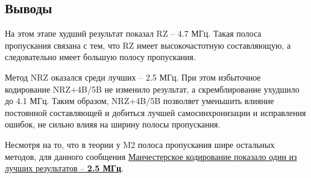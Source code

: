 \newpage
\subsection{Выводы}

На этом этапе худший результат показал RZ – 4.7 МГц. Такая полоса пропускания связана с тем, что RZ имеет высокочастотную составляющую, а следовательно имеет большую полосу пропускания.

Метод NRZ оказался среди лучших – 2.5 МГц. При этом избыточное кодирование NRZ+4B/5B не изменило результат, а скремблирование ухудшило до 4.1 МГц. Таким образом, NRZ+4B/5B позволяет уменьшить влияние постоянной составляющей и добиться лучшей самосинхронизации и исправления ошибок, не сильно влияя на ширину полосы пропускания.

Несмотря на то, что в теории у M2 полоса пропускания шире остальных методов, для данного сообщения \underline{Манчестерское кодирование показало один из} \underline{лучших результатов – \textbf{2.5 МГц}}.
